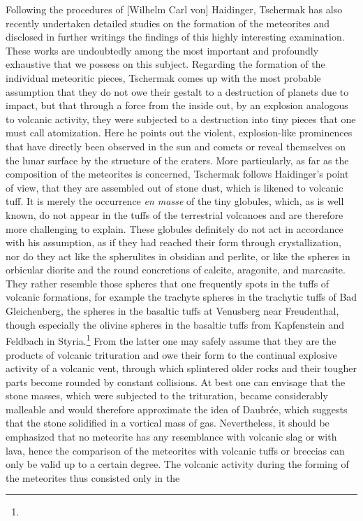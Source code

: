 \documentclass[a4paper, 12pt, oneside]{article}
\begin{document}
Following the procedures of [Wilhelm Carl von] Haidinger, Tschermak has also recently undertaken detailed studies on the formation of the meteorites and disclosed in further writings the findings of this highly interesting examination. These works are undoubtedly among the most important and profoundly exhaustive that we possess on this subject. Regarding the formation of the individual meteoritic pieces, Tschermak comes up with the most probable assumption that they do not owe their gestalt to a destruction of planets due to impact, but that through a force from the inside out, by an explosion analogous to volcanic activity, they were subjected to a destruction into tiny pieces that one must call atomization. Here he points out the violent, explosion-like prominences that have directly been observed in the sun and comets or reveal themselves on the lunar surface by the structure of the craters. More particularly, as far as the composition of the meteorites is concerned, Tschermak follows Haidinger's point of view, that they are assembled out of stone dust, which is likened to volcanic tuff. It is merely the occurrence \emph{en masse} of the tiny globules, which, as is well known, do not appear in the tuffs of the terrestrial volcanoes and are therefore more challenging to explain. These globules definitely do not act in accordance with his assumption, as if they had reached their form through crystallization, nor do they act like the spherulites in obsidian and perlite, or like the spheres in orbicular diorite and the round concretions of calcite, aragonite, and marcasite. They rather resemble those spheres that one frequently spots in the tuffs of volcanic formations, for example the trachyte spheres in the trachytic tuffs of Bad Gleichenberg, the spheres in the basaltic tuffs at Venusberg near Freudenthal, though especially the olivine spheres in the basaltic tuffs from Kapfenstein and Feldbach in Styria.\footnote{} From the latter one may safely assume that they are the products of volcanic trituration and owe their form to the continual explosive activity of a volcanic vent, through which splintered older rocks and their tougher parts become rounded by constant collisions. At best one can envisage that the stone masses, which were subjected to the trituration, became considerably malleable and would therefore approximate the idea of Daubrée, which suggests that the stone solidified in a vortical mass of gas. Nevertheless, it should be emphasized that no meteorite has any resemblance with volcanic slag or with lava, hence the comparison of the meteorites with volcanic tuffs or breccias can only be valid up to a certain degree. The volcanic activity during the forming of the meteorites thus consisted only in the 
\end{document}

